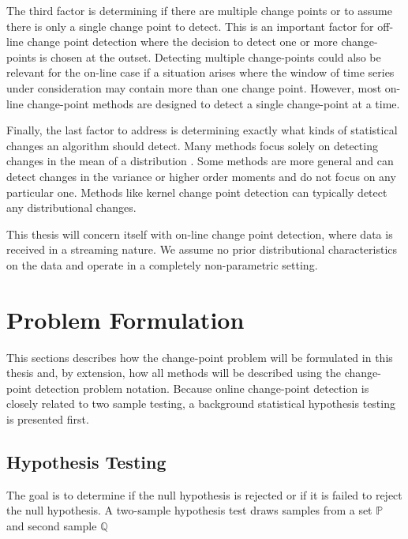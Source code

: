 The third factor is determining if there are multiple change points or to assume there is only a single change point to detect. This is an important  factor for off-line change point detection where the decision to detect one or more change-points is chosen at the outset.  Detecting multiple change-points could also be relevant for the on-line case if a situation arises where the window of time series under consideration may contain more than one change point. However, most on-line change-point methods are designed to detect a single change-point at a time.

Finally, the last factor to address is determining exactly what kinds of statistical changes an algorithm should detect. Many methods focus solely on detecting changes in the mean of a distribution \cite{lee2010change}. Some methods are more general and can detect changes in the variance or higher order moments and do not focus on any particular one. Methods like kernel change point detection can typically detect any distributional changes. 

This thesis will concern itself with on-line change point detection, where data is received in a streaming nature. We assume no prior distributional characteristics on the data and operate in a completely non-parametric setting. 

\section{Problem Formulation}
This sections describes how the change-point problem will be formulated in this thesis and, by extension, how all methods will be described using the change-point detection problem notation. Because online change-point detection is closely related to two sample testing, a background statistical hypothesis testing is presented first. 

\subsection{Hypothesis Testing}
The goal is to determine if the null hypothesis is rejected or if it is failed to reject the null hypothesis. A two-sample hypothesis test draws samples from a set $\mathbb{P}$ and second sample $\mathbb{Q}$ 


